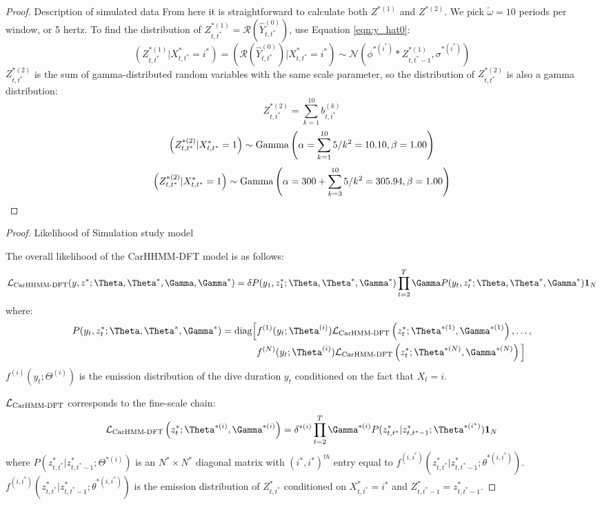 \begin{proof}{Description of simulated data}{}
From here it is straightforward to calculate both $Z^{*(1)}$ and $Z^{*(2)}$. We pick $\tilde{\omega} = 10$ periods per window, or 5 hertz. To find the distribution of $Z^{*(1)}_{t,t^*} = \mathcal{R}\left(\hat{Y}^{(0)}_{t,t^*}\right)$, use Equation \ref{eqn:y_hat0}:
%
$$\left(Z^{*(1)}_{t,t^*} | X^*_{t,t^*} = i^* \right) = \left(\mathcal{R}\left(\hat{Y}^{(0)}_{t,t^*}\right) | X^*_{t,t^*} = i^* \right) \sim \mathcal{N} \left(\phi^{*(i^*)} * Z^{*(1)}_{t,t^*-1}, \sigma^{*(i^*)} \right)$$
%
$Z^{*(2)}_{t,t^*}$ is the sum of gamma-distributed random variables with the same scale parameter, so the distribution of $Z^{*(2)}_{t,t^*}$ is also a gamma distribution:
%
$$Z^{*(2)}_{t,t^*} = \sum_{k=1}^{10} b^{(k)}_{t,t^*}$$
$$\left(Z^{*(2)}_{t,t^*}|X^*_{t,t^*} = 1\right) \sim {\rm{Gamma}}\left(\alpha = \sum_{k=1}^{10} 5/k^2 = 10.10, \beta = 1.00 \right)$$
$$\left(Z^{*(2)}_{t,t^*}|X^*_{t,t^*} = 1\right) \sim {\rm{Gamma}}\left(\alpha = 300 + \sum_{k=3}^{10} 5/k^2 = 305.94 , \beta = 1.00 \right)$$
\end{proof}

\begin{proof}{Likelihood of Simulation study model}{}

The overall likelihood of the CarHHMM-DFT model is as follows:
%
$$\calL_{\text{CarHHMM-DFT}}(y,z^*;\Theta,\Theta^*,\Gamma,\Gamma^*) = \delta P(y_1,z_1^*;\Theta,\Theta^*,\Gamma^*) \prod_{t=2}^T \Gamma P(y_t,z_t^*;\Theta,\Theta^*,\Gamma^*) \mathbf{1}_N$$
%
where:
%
\begin{align*}
P(y_t,z_t^*;\Theta,\Theta^*,\Gamma^*)  = \text{diag}\Big[&f^{(1)}(y_t;\Theta^{(i)})\calL_{\text{CarHMM-DFT}}\left(z_t^*;\Theta^{*(1)},\Gamma^{*(1)}\right), \ldots , \\
&f^{(N)}(y_t;\Theta^{(i)})\calL_{\text{CarHMM-DFT}}\left(z_t^*;\Theta^{*(N)},\Gamma^{*(N)}\right) \Big]
\end{align*}
%
$f^{(i)}(y_t;\Theta^{(i)})$ is the emission distribution of the dive duration $y_t$ conditioned on the fact that $X_t = i$.

$\mathcal{L}_{\text{CarHMM-DFT}}$ corresponds to the fine-scale chain:
%
$$\calL_{\text{CarHMM-DFT}}\left(z_t^*;\Theta^{*(i)},\Gamma^{*(i)}\right) = \delta^{*(i)} \prod_{t=2}^T \Gamma^{*(i)} P(z^*_{t,t^*}|z^*_{t,t^*-1};\Theta^{*(i^*)}) \mathbf{1}_N$$
%
where $P(z^*_{t,t^*}|z^*_{t,t^*-1};\Theta^{*(i)})$ is an $N^* \times N^*$ diagonal matrix with $(i^*,i^*)^{th}$ entry equal to $f^{(i,i^*)}(z^*_{t,t^*}|z^*_{t,t^*-1}; \theta^{*(i,i^*)})$.
%
$f^{(i,i^*)}(z^*_{t,t^*}|z^*_{t,t^*-1}; \theta^{*(i,i^*)})$ is the emission distribution of $Z^*_{t,t^*}$ conditioned on $X^*_{t,t^*} = i^*$ and $Z^*_{t,t^*-1} = z^*_{t,t^*-1}$.

\end{proof}

